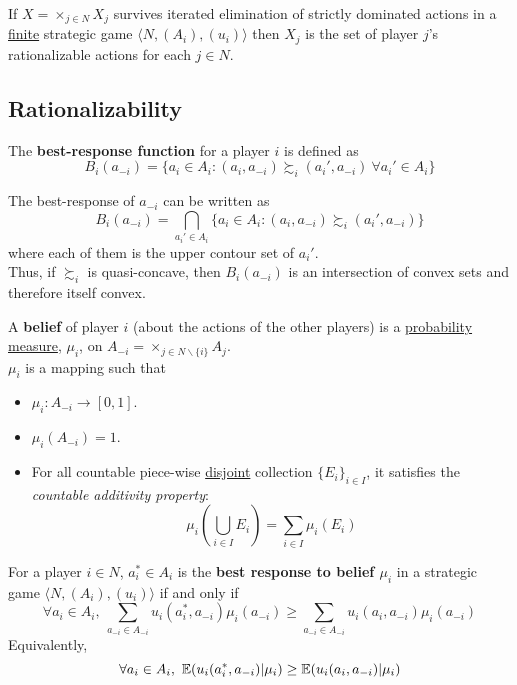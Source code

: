 \documentclass[11pt]{article}
\begin{document}
			\begin{proposition}[61.2]
				If $X = \times_{j \in N}X_j$ survives iterated elimination of strictly dominated actions in a \ul{finite} strategic game $\langle N, (A_i), (u_i) \rangle$ then $X_j$ is the set of player $j$'s rationalizable actions for each $j \in N$.
			\end{proposition}
			
		\subsection{Rationalizability}
			\begin{definition}[pg.15]
				The \textbf{best-response function} for a player $i$ is defined as
				\[
					B_i(a_{-i}) = \{a_i \in A_i : (a_i, a_{-i}) \succsim_i (a_i', a_{-i})\ \forall a_i' \in A_i \}
				\]
			\end{definition}
			
			\begin{remark}
				The best-response of $a_{-i}$ can be written as 
				\[
					B_i(a_{-i}) = \bigcap_{a_i' \in A_i} \{a_i \in A_i : (a_i, a_{-i}) \succsim_i (a_i', a_{-i})\}
				\]
				where each of them is the upper contour set of $a_i'$. \\
				Thus, if $\succsim_i$ is quasi-concave, then $B_i(a_{-i})$ is an intersection of convex sets and therefore itself convex.
			\end{remark}
			\begin{definition}[pg.54]
				A \textbf{belief} of player $i$ (about the actions of the other players) is a \ul{probability measure}, $\mu_i$, on $A_{-i}=\times_{j \in N \backslash \{i\}} A_j$. \\
				$\mu_i$ is a mapping such that
				\begin{itemize}
					\item $\mu_i: A_{-i} \to [0,1]$.
					\item $\mu_i(A_{-i}) = 1$.
					\item For all countable piece-wise \ul{disjoint} collection $\{E_i\}_{i\in I}$, it satisfies the \emph{countable additivity property}:
					\[
						\mu_i(\bigcup_{i \in I} E_i) = \sum_{i \in I}\mu_i(E_i)
					\]
				\end{itemize}
			\end{definition}
			
			\begin{definition}[lec.2]
				For a player $i \in N$, $a_i^* \in A_i$ is the \textbf{best response to belief $\mu_i$} in a strategic game $\langle N, (A_i), (u_i) \rangle$ if and only if 
				\[
					\forall a_i \in A_i,\ \sum_{a_{-i} \in A_{-i}} u_i(a_i^*, a_{-i}) \mu_i(a_{-i}) \geq \sum_{a_{-i} \in A_{-i}} u_i(a_i, a_{-i}) \mu_i(a_{-i})
				\]
				Equivalently,
				\[
					\forall a_i \in A_i,\ \expect{u_i(a_i^*, a_{-i})|\mu_i} \geq \expect{u_i(a_i, a_{-i})|\mu_i}
				\]
			\end{definition}
			
\end{document}
